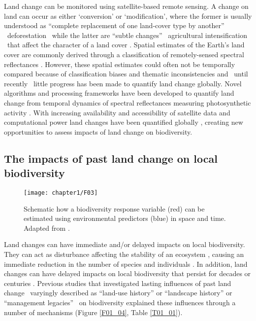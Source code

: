Land change can be monitored using satellite-based remote sensing. A change on land can occur as either ‘conversion’ or ‘modification’, where the former is usually understood as “complete replacement of one land-cover type by another” \textendash\ \ie deforestation \textendash\ while the latter are “subtle changes” \textendash\ \ie agricultural intensification \textendash\ that affect the character of a land cover \citep{Lambin2003,Lambin2006}. Spatial estimates of the Earth’s land cover are commonly derived through a classification of remotely-sensed spectral reflectances \citep{DeFries1994,Hansen2000,DiGregorio2000}. However, these spatial estimates could often not be temporally compared because of classification biases and thematic inconsistencies \citep{VERBURG2011,Estes2018} and \textendash\ until recently \textendash\ little progress has been made to quantify land change globally. Novel algorithms and processing frameworks have been developed to quantify land change from temporal dynamics of spectral reflectances measuring photosynthetic activity \citep[Figure \ref{F01_02}\textbf{c}, ][]{Lhermitte2011,Gomez2016,Zhu2017}. With increasing availability and accessibility of satellite data \citep{Wulder2015} and computational power \citep{Gorelick2017} land changes have been quantified globally \citep{Hansen2013,Pekel2016,Li2018,Song2018}, creating new opportunities to  assess impacts of land change on biodiversity.   


\subsection{The impacts of past land change on local biodiversity}
\label{C01_0102}

\begin{wrapfigure}{r}{0.5\textwidth}
  \begin{flushright}
    \texttt{[image: chapter1/F03]}
  \end{flushright}
  \caption{ Schematic how a biodiversity response variable (red) can be estimated using environmental predictors (blue) in space and time. Adapted from \cite{Ferrier2017}. }
  \label{F01_03}
\end{wrapfigure}

Land changes can have immediate and/or delayed impacts on local biodiversity. They can act as disturbance affecting the stability of an ecosystem \citep{Pimm1984,Scheffer2003}, causing an immediate reduction in the number of species and individuals \citep{Nimmo2015,Ratajczak2018}. In addition, land changes can have delayed impacts on local biodiversity that persist for decades \citep{Martin2013,Moreno-Mateos2017} or centuries \citep{Vegas-Vilarrubia2011,McMichael2017}. Previous studies that investigated lasting influences of past land change \textendash\ varyingly described as “land-use history” or “landscape history” \citep{Bellemare2002,Foster2003,Ewers2013} or “management legacies” \citep{Perring2015} \textendash\ on biodiversity explained these influences through a number of mechanisms (Figure \ref{F01_04}, Table \ref{T01_01}).

